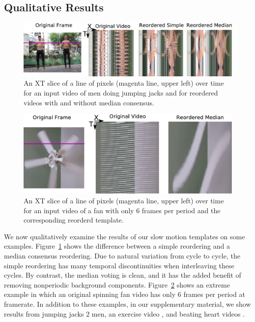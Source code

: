 \documentclass{article}
\begin{document}
\subsection{Qualitative Results}
\begin{figure}
\centering
\includegraphics[width=\columnwidth]{XTSliceJumpingJacks.pdf}
\caption{An XT slice of a line of pixels (magenta line, upper left) over time for an input video of men doing jumping jacks and for reordered videos with and without median consensus.}
\label{fig:XTSliceJumpingJacks}
\end{figure}

\begin{figure}
\centering
\includegraphics[width=\columnwidth]{XTSliceFan.pdf}
\caption{An XT slice of a line of pixels (magenta line, upper left) over time for an input video of a fan with only 6 frames per period and the corresponding reorderd template.}
\label{fig:XTSliceFan}
\end{figure}

We now qualitatively examine the results of our slow motion templates on some examples.  Figure~\ref{fig:XTSliceJumpingJacks} shows the difference between a simple reordering and a median consensus reordering.  Due to natural variation from cycle to cycle, the simple reordering has many temporal discontinuities when interleaving these cycles.  By contrast, the median voting is clean, and it has the added benefit of removing nonperiodic background components.  Figure~\ref{fig:XTSliceFan} shows an extreme example in which an original spinning fan video has only 6 frames per period at framerate.  In addition to these examples, in our supplementary material, we show results from jumping jacks 2 men, an exercise video \cite{levy2015live}, and beating heart videos \cite{traliehigh, wadhwa2013phase}.
\end{document}
